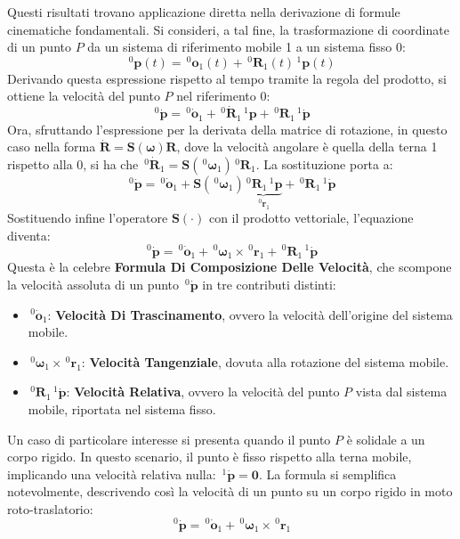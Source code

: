 ﻿\documentclass[11pt, a4paper]{article}
\begin{document}
Questi risultati trovano applicazione diretta nella derivazione di formule cinematiche fondamentali. Si consideri, a tal fine, la trasformazione di coordinate di un punto \(P\) da un sistema di riferimento mobile 1 a un sistema fisso 0:
\[
    \,^{0}{\bm{p}}(t) = \,^{0}{\bm{o}}_1(t) + \,^{0}{\bm{R}}_1(t) \,^{1}{\bm{p}}(t)
\]
Derivando questa espressione rispetto al tempo tramite la regola del prodotto, si ottiene la velocità del punto \(P\) nel riferimento 0:
\[
    \,^{0}{\dot{\bm{p}}} = \,^{0}{\dot{\bm{o}}}_1 + \,^{0}\dot{\bm{R}}_1 \,^{1}{\bm{p}} + \,^{0}{\bm{R}}_1 \,^{1}{\dot{\bm{p}}}
\]
Ora, sfruttando l'espressione per la derivata della matrice di rotazione, in questo caso nella forma \(\dot{\bm{R}} = \bm{S}({\bm{\omega}}) \bm{R}\), dove la velocità angolare è quella della terna 1 rispetto alla 0, si ha che \(\,^{0}\dot{\bm{R}}_1 = \bm{S}(\,^{0}{\bm{\omega}}_1) \,^{0}{\bm{R}}_1\). La sostituzione porta a:
\[
    \,^{0}{\dot{\bm{p}}} = \,^{0}{\dot{\bm{o}}}_1 + \bm{S}(\,^{0}{\bm{\omega}}_1) \underbrace{\,^{0}{\bm{R}}_1 \,^{1}{\bm{p}}}_{\,^{0}{\bm{r}}_1} + \,^{0}{\bm{R}}_1 \,^{1}{\dot{\bm{p}}}
\]
Sostituendo infine l'operatore \(\bm{S}(\cdot)\) con il prodotto vettoriale, l'equazione diventa:
\[
    \,^{0}{\dot{\bm{p}}} = \,^{0}{\dot{\bm{o}}}_1 + \,^{0}{\bm{\omega}}_1 \times \,^{0}{\bm{r}}_1 + \,^{0}{\bm{R}}_1 \,^{1}{\dot{\bm{p}}}
\]
Questa è la celebre \textbf{Formula Di Composizione Delle Velocità}, che scompone la velocità assoluta di un punto \(\,^{0}{\dot{\bm{p}}}\) in tre contributi distinti:
\begin{itemize}
    \item \(\,^{0}{\dot{\bm{o}}}_1\): \textbf{Velocità Di Trascinamento}, ovvero la velocità dell'origine del sistema mobile.
    \item \(\,^{0}{\bm{\omega}}_1 \times \,^{0}{\bm{r}}_1\): \textbf{Velocità Tangenziale}, dovuta alla rotazione del sistema mobile.
    \item \(\,^{0}{\bm{R}}_1 \,^{1}{\dot{\bm{p}}}\): \textbf{Velocità Relativa}, ovvero la velocità del punto \(P\) vista dal sistema mobile, riportata nel sistema fisso.
\end{itemize}
Un caso di particolare interesse si presenta quando il punto \(P\) è solidale a un corpo rigido. In questo scenario, il punto è fisso rispetto alla terna mobile, implicando una velocità relativa nulla: \(\,^{1}{\dot{\bm{p}}} = \bm{0}\). La formula si semplifica notevolmente, descrivendo così la velocità di un punto su un corpo rigido in moto roto-traslatorio:
\[
    \,^{0}{\dot{\bm{p}}} = \,^{0}{\dot{\bm{o}}}_1 + \,^{0}{\bm{\omega}}_1 \times \,^{0}{\bm{r}}_1
\]
\end{document}

